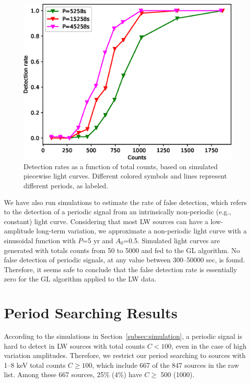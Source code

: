 \documentclass[fleqn,usenatbib]{mnras}
\begin{document}
\begin{figure}
\centering
\includegraphics[scale=0.61]{./figure/sim_LW/eclipse_cut.eps}
\caption{Detection rates as a function of total counts, based on simulated piecewise light curves. Different colored symbols and lines represent different periods, as labeled.}\label{fig:eclipse}
\end{figure}

We have also run simulations to estimate the rate of false detection, which refers to the detection of a periodic signal from an intrinsically non-periodic (e.g., constant) light curve. 
Considering that most LW sources can have a low-amplitude long-term variation, we approximate a non-periodic light curve with a sinusoidal function with $P$=5 yr and $A_0$=0.5. 
Simulated light curves are generated with totals counts from 50 to 5000 and fed to the GL algorithm. No false detection of periodic signals, at any value between 300--50000 sec, is found. 
Therefore, it seems safe to conclude that the false detection rate is essentially zero for the GL algorithm applied to the LW data. 

\section{Period Searching Results}\label{sec:results}
According to the simulations in Section~\ref{subsec:simulation}, a periodic signal is hard to detect in LW sources with total counts $C<100$, even in the case of high variation amplitudes.  
Therefore, we restrict our period searching to sources with 1--8 keV total counts $C \geq 100$, which include 667 of the 847 sources in the raw list. Among these 667 sources, 25\% (4\%) have $C \geq$ 500 (1000).
\end{document}
